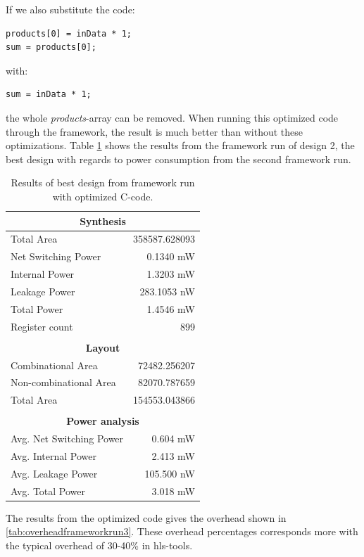 If we also substitute the code:
\begin{lstlisting}
products[0] = inData * 1;
sum = products[0];
\end{lstlisting}
with:
\begin{lstlisting}
sum = inData * 1;
\end{lstlisting}
the whole \textit{products}-array can be removed. When running this optimized code through the framework, the result is much better than without these optimizations. Table \ref{tab:resultsframeworkrun3} shows the results from the framework run of design 2, the best design with regards to power consumption from the second framework run.

\begin{table}[hbtp]
    \centering
    \begin{tabular}{lr}
    \multicolumn{2}{c}{\textbf{Synthesis}} \\
    \toprule
    Total Area & 358587.628093 \\
    \hline
    Net Switching Power & 0.1340 mW \\
    Internal Power & 1.3203 mW \\
    Leakage Power & 283.1053 nW \\
    \hline
    Total Power & 1.4546 mW \\
    \hline
    Register count & 899 \\ 
    \bottomrule
    & \\
    \multicolumn{2}{c}{\textbf{Layout}} \\
    \toprule
    Combinational Area & 72482.256207 \\
    Non-combinational Area & 82070.787659 \\
    \hline
    Total Area & 154553.043866 \\
    \bottomrule
    & \\
    \multicolumn{2}{c}{\textbf{Power analysis}} \\
    \toprule
    Avg. Net Switching Power & 0.604 mW \\
    Avg. Internal Power & 2.413 mW \\
    Avg. Leakage Power & 105.500 nW \\
    \hline
    Avg. Total Power & 3.018 mW \\
    \bottomrule
    \end{tabular}
    \caption{Results of best design from framework run with optimized C-code.}
    \label{tab:resultsframeworkrun3}
\end{table}
The results from the optimized code gives the overhead shown in \cref{tab:overheadframeworkrun3}. These overhead percentages corresponds more with the typical overhead of 30-40\% in \gls{hls}-tools.

